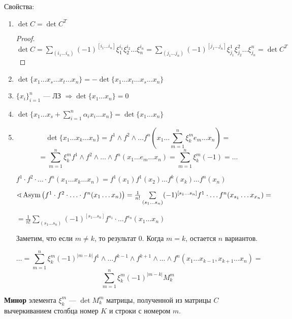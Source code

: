 Свойства:
\begin{enumerate}
    \item \(\det C=\det C^T\)
          \begin{proof}
              \(\det C = \sum\limits_{(i_1\ldots i_n)}(-1)^{[i_1\ldots i_n]}\xi_1^{i_1}\xi_2^{i_2}\ldots \xi_n^{i_n} = \sum\limits_{(j_1\ldots j_n)}(-1)^{[j_1\ldots j_n]} \xi^1_{j_1}\xi^2_{j_2}\ldots \xi^n_{j_n}=\det C^T\)
          \end{proof}
    \item \(\det \{x_1\ldots x_s\ldots x_t\ldots x_n\}=-\det \{x_1\ldots x_t\ldots x_s\ldots x_n\}\)
    \item \(\{x_i\}_{i=1}^n\) --- ЛЗ \(\Rightarrow \det \{x_1\ldots x_n\}=0\)
    \item \(\det\{x_1\ldots x_s+\sum\limits_{i=1}^n\alpha_i x_i\ldots x_n\}=\det\{x_1\ldots x_n\}\)
    \item \[\det\{x_1\ldots x_k\ldots x_n\}=f^1\wedge f^2\wedge \ldots f^n(x_1\ldots \sum\limits_{m=1}^{n}\xi_k^me_m\ldots x_n)=\]\[=\sum\limits_{m=1}^{n}\xi^m_k f^1\wedge f^2\wedge\ldots\wedge f^n(x_1\ldots e_m\ldots x_n)=\sum\limits_{m=1}^{n}\xi_k^m(-1)=\ldots\]
          \begin{remark}
              \(f^1\cdot f^2\cdot \ldots \cdot f^n(x_1\ldots x_k\ldots x_n)=f^1(x_1)f^1(x_2)\ldots f^k(x_k)\ldots f^n(x_n)\)

              \(\sphericalangle \operatorname{\text{Asym}}\left(f^1\cdot f^2\cdot \ldots \cdot f^n(x_1\ldots x_n) \right)=\frac{1}{n!}\sum\limits_{(s_1\ldots s_n)}(-1)^{[s_1\ldots s_n]} f^1\cdot \ldots f^n(x_{s_1}\ldots x_{x_n})=\)

              \(=\frac{1}{n!}\sum\limits_{(s_1\ldots s_n)}(-1)^{[s_1\ldots s_n]} f^{s_1}\cdot \ldots f^{s_n}(x_1\ldots x_n)\)

              Заметим, что если \(m\not=k\), то результат \(0\). Когда \(m=k\), остается \(n\) вариантов.
          \end{remark}

          \[\ldots =\sum\limits_{m=1}^n \xi_k^m (-1)^{|m-k|} f^1\wedge \ldots f^{k-1}\wedge f^{k+1}\wedge\ldots\wedge f^n(x_1\ldots x_{k-1},x_{k+1}\ldots x_n)=\]
          \[\sum\limits_{m=1}^n \xi_k^m(-1)^{|m-k|}M_k^m\]
\end{enumerate}
\begin{definition}
    \textbf{Минор} элемента \(\xi_k^m\) --- \(\det M_k^m\) матрицы, полученной из матрицы \(C\) вычеркиванием столбца номер \(K\) и строки с номером \(m\).
\end{definition}

